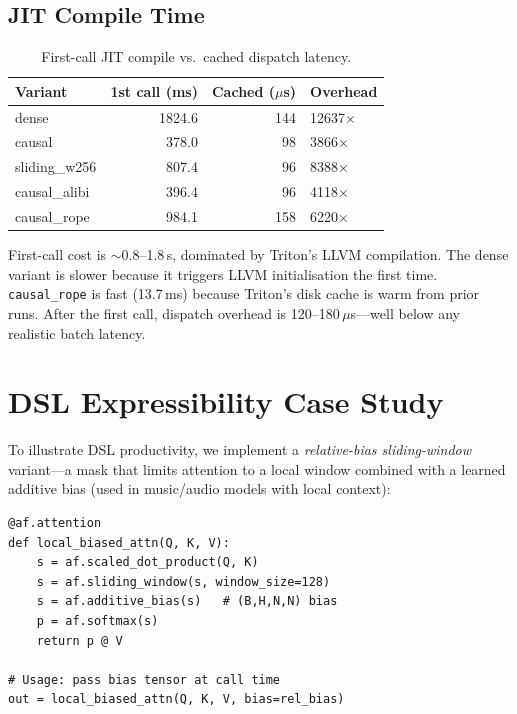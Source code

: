 \documentclass[10pt,twocolumn]{article}
\begin{document}
\subsection{JIT Compile Time}

\begin{table}[H]
\centering
\caption{First-call JIT compile vs.\ cached dispatch latency.}
\label{tab:jit}
\small
\begin{tabular}{lrrl}
\toprule
\textbf{Variant} & \textbf{1st call (ms)} & \textbf{Cached ($\mu$s)} & \textbf{Overhead} \\
\midrule
dense         & 1824.6 & 144 & 12637$\times$ \\
causal        &  378.0 &  98 &  3866$\times$ \\
sliding\_w256 &  807.4 &  96 &  8388$\times$ \\
causal\_alibi &  396.4 &  96 &  4118$\times$ \\
causal\_rope  &  984.1 & 158 &  6220$\times$ \\
\bottomrule
\end{tabular}
\end{table}

First-call cost is $\sim$0.8--1.8\,s, dominated by Triton's LLVM
compilation.  The dense variant is slower because it triggers LLVM
initialisation the first time.  \texttt{causal\_rope} is fast (13.7\,ms)
because Triton's disk cache is warm from prior runs.  After the first call,
dispatch overhead is 120--180\,$\mu$s---well below any realistic batch latency.

\section{DSL Expressibility Case Study}

To illustrate DSL productivity, we implement a \emph{relative-bias
sliding-window} variant---a mask that limits attention to a local window
combined with a learned additive bias (used in music/audio models with
local context):

\begin{lstlisting}[caption={Novel variant in 7 lines of AttnFuse DSL.}]
@af.attention
def local_biased_attn(Q, K, V):
    s = af.scaled_dot_product(Q, K)
    s = af.sliding_window(s, window_size=128)
    s = af.additive_bias(s)   # (B,H,N,N) bias
    p = af.softmax(s)
    return p @ V

# Usage: pass bias tensor at call time
out = local_biased_attn(Q, K, V, bias=rel_bias)
\end{lstlisting}
\end{document}
